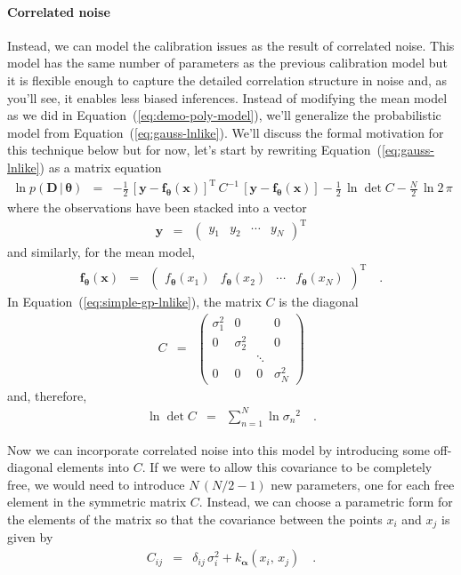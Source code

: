 \documentclass[12pt,preprint]{aastex}
\newcommand{\Eq}[1]{Equation~(\ref{eq:#1})}
\newcommand{\eq}[1]{\Eq{#1}}
\newcommand{\eqlabel}[1]{\label{eq:#1}}
\newcommand{\bvec}[1]{{\ensuremath{\boldsymbol{#1}}}}
\newcommand{\params}{{\ensuremath{\boldsymbol{\theta}}}}
\newcommand{\data}{{\ensuremath{\boldsymbol{D}}}}
\newcommand{\hyperpar}{{\ensuremath{\alpha}}}
\newcommand{\hyperpars}{{\ensuremath{\boldsymbol{\hyperpar}}}}
\begin{document}
\paragraph{Correlated noise}
Instead, we can model the calibration issues as the result of correlated noise.
This model has the same number of parameters as the previous calibration model
but it is flexible enough to capture the detailed correlation structure in
noise and, as you'll see, it enables less biased inferences.
Instead of modifying the mean model as we did in \eq{demo-poly-model}, we'll
generalize the probabilistic model from \eq{gauss-lnlike}.
We'll discuss the formal motivation for this technique below but for now,
let's start by rewriting \eq{gauss-lnlike} as a matrix equation
\begin{eqnarray}\eqlabel{simple-gp-lnlike}
\ln p (\data\,|\,\params) &=&
-\frac{1}{2}\,\left[\bvec{y}-\bvec{f}_\params(\bvec{x})\right]^\mathrm{T}\,
    C^{-1} \, \left [\bvec{y} - \bvec{f}_\params(\bvec{x}) \right ]
-\frac{1}{2}\,\ln\det C - \frac{N}{2}\,\ln 2\,\pi
\end{eqnarray}
where the observations have been stacked into a vector
\begin{eqnarray}
\bvec{y} &=& \left ( \begin{array}{cccc}
y_1 & y_2 & \cdots & y_N
\end{array} \right )^\mathrm{T}
\end{eqnarray}
and similarly, for the mean model,
\begin{eqnarray}
\bvec{f}_\params(\bvec{x}) &=& \left ( \begin{array}{cccc}
f_\params(x_1) & f_\params(x_2) & \cdots & f_\params(x_N)
\end{array} \right )^\mathrm{T} \quad.
\end{eqnarray}
In \eq{simple-gp-lnlike}, the matrix $C$ is the diagonal
\begin{eqnarray}
C &=& \left (\begin{array}{cccc}
\sigma_1^2 & 0 & & 0 \\
0 & \sigma_2^2 & & 0 \\
& & \ddots & \\
0 & 0 & 0 & \sigma_N^2
\end{array}\right )
\end{eqnarray}
and, therefore,
\begin{eqnarray}
\ln\det C &=& \sum_{n=1}^{N} \ln {\sigma_n}^2 \quad.
\end{eqnarray}

Now we can incorporate correlated noise into this model by introducing some
off-diagonal elements into $C$.
If we were to allow this covariance to be completely free, we would need to
introduce $N\,(N/2-1)$ new parameters, one for each free element in the
symmetric matrix $C$.
Instead, we can choose a parametric form for the elements of the matrix so
that the covariance between the points $x_i$ and $x_j$ is given by
\begin{eqnarray}
C_{ij} &=& \delta_{ij}\,\sigma_i^2 + k_\hyperpars(x_i,\,x_j) \quad.
\end{eqnarray}
\end{document}

